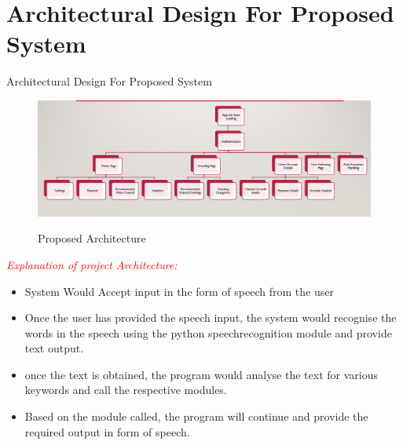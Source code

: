 \documentclass{beamer}
\begin{document}
\section{Architectural Design For Proposed System}
\begin{frame}[allowframebreaks]{Architectural Design For Proposed System}
    \begin{figure}
		{\includegraphics[scale=.4]{arch.PNG}}
			\caption{Proposed Architecture}
			\label{arch1}
	\end{figure}
	\begin{center}
	\textcolor{red}{\textit{Explanation of project Architecture: }}\\
	\begin{itemize}
		\item  System Would Accept input in the form of speech from the user 
		\item  Once the user has provided the speech input, the system would recognise the words in the speech using the python speechrecognition module and provide text output.
		\item  once the text is obtained, the program would analyse the text for various keywords and call the respective modules. 
		\item  Based on the module called, the program will continue and provide the required output in form of speech.
		\end{itemize}
    \end{center}
\end{frame}
\end{document}
